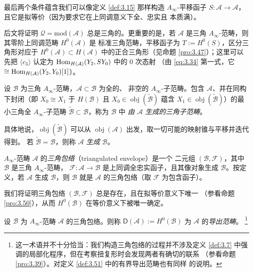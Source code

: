 最后两个条件蕴含我们可以像定义 \ref{def:3.15} 那样构造 $A_\infty$-平移函子
$S:\mathcal A\to\mathcal A$，且它是拟等价（因为要求它在上同调意义下全、忠实且
本质满）。

后文将证明 $\mathcal Q=\mathrm{mod}(\mathcal A)$ 总是三角的。更重要的是，若
$\mathcal A$ 是三角 $A_\infty$-范畴，则其零阶上同调范畴 $H^0(\mathcal A)$ 是
标准三角范畴，平移函子为 $T:=H^0(S)$，区分三角形对应于 $H^0(\mathcal A)\subset
H(\mathcal A)$ 中的正合三角形（见命题 \ref{pro:3.47}）；这里可以先把
$\langle c_3\rangle$ 认定为 $\operatorname{Hom}_{H(\mathcal A)}(Y_2,SY_0)$ 中的 0 次态射
（由 \eqref{eq:3.34} 第一式，它 $\cong\operatorname{Hom}_{H(\mathcal A)}(Y_2,Y_0)[1]$）。

\begin{Def}\label{def:3.22}
设 $\mathcal B$ 为三角 $A_\infty$-范畴，$\mathcal A\subset\mathcal B$ 为全的、
非空的 $A_\infty$-子范畴。包含 $\mathcal A$、并在同构下封闭（即
$X_0\cong X_1$ 于 $H(\mathcal B)$ 且 $X_0\in\operatorname{obj}(\tilde{\mathcal B})$
蕴含 $X_1\in\operatorname{obj}(\tilde{\mathcal B})$）的最小三角全
$A_\infty$-子范畴 $\tilde{\mathcal B}\subset\mathcal B$，称为 $\mathcal B$ 中
\emph{由 $\mathcal A$ 生成的三角子范畴}。
\end{Def}

具体地说，$\operatorname{obj}(\tilde{\mathcal B})$ 可以从
$\operatorname{obj}(\mathcal A)$ 出发，取一切可能的映射锥与平移并迭代得到。
若 $\tilde{\mathcal B}=\mathcal B$，则称 $\mathcal A$ \emph{生成} $\mathcal B$。

$A_\infty$-范畴 $\mathcal A$ 的\emph{三角包络}（triangulated envelope）是一个
二元组 $(\mathcal B,\mathcal F)$，其中 $\mathcal B$ 是三角 $A_\infty$-范畴，
$\mathcal F:\mathcal A\to\mathcal B$ 是上同调全忠实函子，且其像对象生成
$\mathcal B$。按定义，若 $\mathcal A$ 生成 $\mathcal B$，则 $\mathcal B$ 就是
$\mathcal A$ 的三角包络（取 $\mathcal F$ 为包含函子）。

我们将证明三角包络 $(\mathcal B,\mathcal F)$ 总是存在，且在拟等价意义下唯一
（参看命题 \ref{pro:3.50}），从而 $H^0(\mathcal B)$ 在等价意义下被唯一确定。

\begin{Def}\label{def:3.23}
设 $\mathcal B$ 为 $A_\infty$-范畴 $\mathcal A$ 的三角包络。则称
$\mathsf D(\mathcal A):=H^0(\mathcal B)$ 为 $\mathcal A$ 的\emph{导出范畴}。%
\footnote{这一术语并不十分恰当：我们构造三角包络的过程并不涉及定义
\ref{def:3.7} 中强调的局部化程序，但在考察扭复形时会发现两者有确切的联系
（参看命题 \ref{pro:3.39}）。对定义 \ref{def:3.51} 中的有界导出范畴也有同样
的说明。}
\end{Def}

